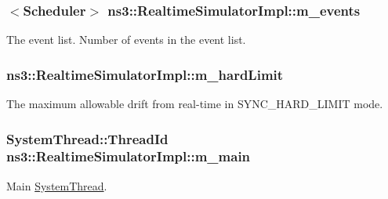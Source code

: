 \subsubsection[{\texorpdfstring{m\+\_\+events}{m_events}}]{$<${\bf Scheduler}$>$ ns3\+::\+Realtime\+Simulator\+Impl\+::m\+\_\+events\hspace{0.3cm}{\ttfamily [private]}}\hypertarget{classns3_1_1RealtimeSimulatorImpl_a0cccd690eafca8285f5cc4d3909a9593}{}\label{classns3_1_1RealtimeSimulatorImpl_a0cccd690eafca8285f5cc4d3909a9593}
The event list. Number of events in the event list. 
\subsubsection[{\texorpdfstring{m\+\_\+hard\+Limit}{m_hardLimit}}]{ ns3\+::\+Realtime\+Simulator\+Impl\+::m\+\_\+hard\+Limit\hspace{0.3cm}{\ttfamily [private]}}\hypertarget{classns3_1_1RealtimeSimulatorImpl_a9c3322bfb7203676b5a50f3ac5e4f31f}{}\label{classns3_1_1RealtimeSimulatorImpl_a9c3322bfb7203676b5a50f3ac5e4f31f}
The maximum allowable drift from real-\/time in S\+Y\+N\+C\+\_\+\+H\+A\+R\+D\+\_\+\+L\+I\+M\+IT mode. 
\subsubsection[{\texorpdfstring{m\+\_\+main}{m_main}}]{\setlength{\rightskip}{0pt plus 5cm}System\+Thread\+::\+Thread\+Id ns3\+::\+Realtime\+Simulator\+Impl\+::m\+\_\+main\hspace{0.3cm}{\ttfamily [private]}}\hypertarget{classns3_1_1RealtimeSimulatorImpl_aaa303327c2bd048980223e4f4fea1be6}{}\label{classns3_1_1RealtimeSimulatorImpl_aaa303327c2bd048980223e4f4fea1be6}
Main \hyperlink{classns3_1_1SystemThread}{System\+Thread}. 
